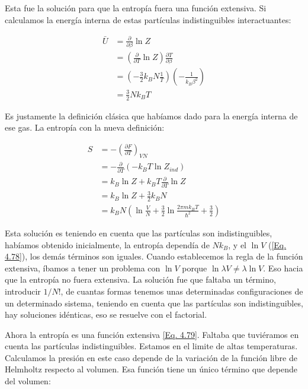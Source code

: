 \documentclass[11pt,fleqn]{book}
\begin{document}
Esta fue la solución para que la entropía fuera una función extensiva. Si calculamos la energía interna de estas partículas indistinguibles interactuantes:

\begin{equation}
\begin{split}
    \bar{U}&=\frac{\partial}{\partial\beta}\ln{Z}\\
    &=\left(\frac{\partial}{\partial T}\ln{Z}\right)\frac{\partial T}{\partial\beta}\\
    &=\left(-\frac{3}{2}k_{B}N\frac{1}{T}\right)\left(-\frac{1}{k_{B}\beta^{2}}\right)\\
    &=\frac{3}{2}Nk_{B}T
      \end{split}  
    \label{Eq. 4.84}
\end{equation}

Es justamente la definición clásica que habíamos dado para la energía interna de ese gas. La entropía con la nueva definición:

\begin{equation}
\begin{split}
    S&=-\left(\frac{\partial F}{\partial T}\right)_{VN}\\
    &= -\frac{\partial}{\partial T}(-k_{B}T\ln{Z_{ind}})\\
    &=k_{B}\ln{Z}+k_{B}T\frac{\partial}{\partial T}\ln{Z}\\
    &=k_{B}\ln{Z}+\frac{3}{2}k_{B}N\\
    &=k_{B}N\left(\ln{\frac{V}{N}}+\frac{3}{2}\ln{\frac{2\pi mk_{B}T}{\hslash^{2}}}+\frac{3}{2}\right)
      \end{split}  
    \label{Eq. 4.85}
\end{equation}

Esta solución es teniendo en cuenta que las partículas son indistinguibles, habíamos obtenido inicialmente, la entropía dependía de $Nk_{B}$, y el $\ln{V}$ (\ref{Eq. 4.78}), los demás términos son iguales. Cuando establecemos la regla de la función extensiva, íbamos a tener un problema con $\ln{V}$ porque $\ln{\lambda V}\neq\lambda\ln{V}$. Eso hacia que la entropía no fuera extensiva. La solución fue que faltaba un término, introducir $1/N!$, de cuantas formas tenemos unas determinadas configuraciones de un determinado sistema, teniendo en cuenta que las partículas son indistinguibles, hay soluciones idénticas, eso se resuelve con el factorial. 

Ahora la entropía es una función extensiva \ref{Eq. 4.79}. Faltaba que tuviéramos en cuenta las partículas indistinguibles. Estamos en el limite de altas temperaturas. Calculamos la presión en este caso depende de la variación de la función libre de Helmholtz respecto al volumen. Esa función tiene un único término que depende del volumen:
\end{document}
